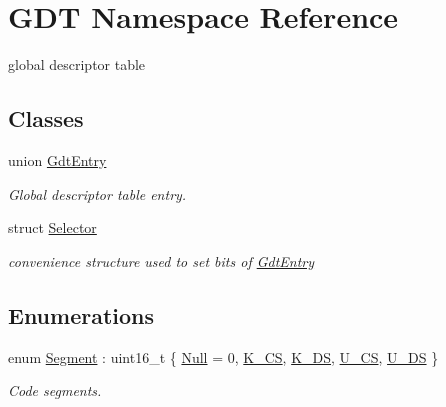 \hypertarget{namespace_g_d_t}{}\section{G\+DT Namespace Reference}
\label{namespace_g_d_t}


global descriptor table  


\subsection*{Classes}
\begin{DoxyCompactItemize}
\item 
union \hyperlink{union_g_d_t_1_1_gdt_entry}{Gdt\+Entry}
\begin{DoxyCompactList}\small\item\em Global descriptor table entry. \end{DoxyCompactList}\item 
struct \hyperlink{struct_g_d_t_1_1_selector}{Selector}
\begin{DoxyCompactList}\small\item\em convenience structure used to set bits of \hyperlink{union_g_d_t_1_1_gdt_entry}{Gdt\+Entry} \end{DoxyCompactList}\end{DoxyCompactItemize}
\subsection*{Enumerations}
\begin{DoxyCompactItemize}
\item 
enum \hyperlink{namespace_g_d_t_af2b09941ee46a489ebaccfed5c839154}{Segment} \+: uint16\+\_\+t \{ \newline
\hyperlink{namespace_g_d_t_af2b09941ee46a489ebaccfed5c839154a86e32c8df1a16bdd2971d97063048cff}{Null} = 0, 
\hyperlink{namespace_g_d_t_af2b09941ee46a489ebaccfed5c839154a9ec147ba7f4244a0e047c92f24a920b9}{K\+\_\+\+CS}, 
\hyperlink{namespace_g_d_t_af2b09941ee46a489ebaccfed5c839154a71647052ea8761e0f719dfb481a72f0b}{K\+\_\+\+DS}, 
\hyperlink{namespace_g_d_t_af2b09941ee46a489ebaccfed5c839154a1d5e8e72d040439207b2341afb78e530}{U\+\_\+\+CS}, 
\newline
\hyperlink{namespace_g_d_t_af2b09941ee46a489ebaccfed5c839154a62f547535bd854846bc3d457a3f37eeb}{U\+\_\+\+DS}
 \}\begin{DoxyCompactList}\small\item\em Code segments. \end{DoxyCompactList}
\end{DoxyCompactItemize}
